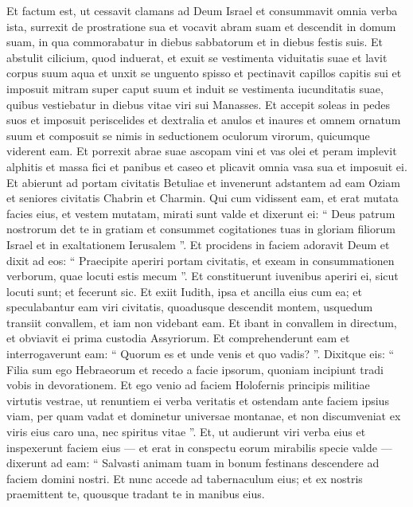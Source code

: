 \begin{biblechapter}
\begin{biblechapter}
\begin{biblechapter}
\begin{biblechapter}
\begin{biblechapter}
\begin{biblechapter}
\begin{biblechapter}
\begin{biblechapter}
\begin{biblechapter}
\begin{biblechapter}
\verse Et factum est, ut cessavit clamans ad Deum Israel et consummavit omnia verba ista, 
\verse surrexit de prostratione sua et vocavit abram suam et descendit in domum suam, in qua commorabatur in diebus sabbatorum et in diebus festis suis. 
\verse Et abstulit cilicium, quod induerat, et exuit se vestimenta viduitatis suae et lavit corpus suum aqua et unxit se unguento spisso et pectinavit capillos capitis sui et imposuit mitram super caput suum et induit se vestimenta iucunditatis suae, quibus vestiebatur in diebus vitae viri sui Manasses. 
\verse Et accepit soleas in pedes suos et imposuit periscelides et dextralia et anulos et inaures et omnem ornatum suum et composuit se nimis in seductionem oculorum virorum, quicumque viderent eam. 
\verse Et porrexit abrae suae ascopam vini et vas olei et peram implevit alphitis et massa fici et panibus et caseo et plicavit omnia vasa sua et imposuit ei.
 \verse Et abierunt ad portam civitatis Betuliae et invenerunt adstantem ad eam Oziam et seniores civitatis Chabrin et Charmin. 
\verse Qui cum vidissent eam, et erat mutata facies eius, et vestem mutatam, mirati sunt valde et dixerunt ei: 
\verse “ Deus patrum nostrorum det te in gratiam et consummet cogitationes tuas in gloriam filiorum Israel et in exaltationem Ierusalem ”. 
\verse Et procidens in faciem adoravit Deum et dixit ad eos: “ Praecipite aperiri portam civitatis, et exeam in consummationen verborum, quae locuti estis mecum ”. Et constituerunt iuvenibus aperiri ei, sicut locuti sunt; 
\verse et fecerunt sic. Et exiit Iudith, ipsa et ancilla eius cum ea; et speculabantur eam viri civitatis, quoadusque descendit montem, usquedum transiit convallem, et iam non videbant eam.
 \verse Et ibant in convallem in directum, et obviavit ei prima custodia Assyriorum. 
\verse Et comprehenderunt eam et interrogaverunt eam: “ Quorum es et unde venis et quo vadis? ”. Dixitque eis: “ Filia sum ego Hebraeorum et recedo a facie ipsorum, quoniam incipiunt tradi vobis in devorationem. 
\verse Et ego venio ad faciem Holofernis principis militiae virtutis vestrae, ut renuntiem ei verba veritatis et ostendam ante faciem ipsius viam, per quam vadat et dominetur universae montanae, et non discumveniat ex viris eius caro una, nec spiritus vitae ”. 
\verse Et, ut audierunt viri verba eius et inspexerunt faciem eius — et erat in conspectu eorum mirabilis specie valde — dixerunt ad eam: 
\verse “ Salvasti animam tuam in bonum festinans descendere ad faciem domini nostri. Et nunc accede ad tabernaculum eius; et ex nostris praemittent te, quousque tradant te in manibus eius. 

\end{biblechapter}
\end{biblechapter}
\end{biblechapter}
\end{biblechapter}
\end{biblechapter}
\end{biblechapter}
\end{biblechapter}
\end{biblechapter}
\end{biblechapter}
\end{biblechapter}
